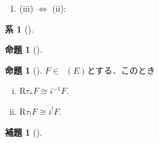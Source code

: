 \documentclass[leqno, 10pt, a4paper, dvipdfmx]{jsarticle}
\makeatletter
\theoremstyle{definition}
\newcommand{\rr}{\mathbf{R}}
\renewenvironment{proof}[1][\proofname]{\par
  \pushQED{\qed}%
  \normalfont \topsep6\p@\@plus6\p@\relax
  \trivlist
  \item[\hskip\labelsep
         \bfseries
    {#1}]\ignorespaces
}{%
  \popQED\endtrivlist\@endpefalse
}
\renewcommand{\proofname}{証明.}
\numberwithin{equation}{section}
\newcommand{\Rder}{\mathrm{R}}
\theoremstyle{mystyle}
\newtheorem{PRP}[AXM]{命題}
\newtheorem{LMM}[AXM]{補題}
\newtheorem{CRL}[AXM]{系}
\renewenvironment{leftbar}{%
  \def\FrameCommand{\textcolor{lightgray}{\vrule width 4pt} \hspace{10pt}}%
  \MakeFramed {\advance\hsize-\width \FrameRestore}}%
{\endMakeFramed}
\newcommand{\Dlcon}{\mathop{\mathsf{D}^{+}_{\rr_{>0}}}\nolimits}
\makeatother
\begin{document}
\begin{proof}
\begin{enumerate}
\begin{align*}
            &\cong
            p^{-1}\left. H^j\left(F\right)\right\rvert_{p^{-1}(x)}\\
            &\cong
            i^{-1}_{p^{-1}(x)}p^{-1}H^j\left(F\right)\\
            &\cong
            \left(p\circ i_{p^{-1}(x)}\right)^{-1}H^j\left(F\right)\\
            &\cong
            \left(i_{x}\circ p\rvert_{p^{-1}(x)}\right)^{-1}H^j\left(F\right)\\
            &\cong
            \left(p\rvert_{p^{-1}(x)}\right)^{-1}i_{x}^{-1}H^j\left(F\right)\\
            &\cong
            \left(p\rvert_{p^{-1}(x)}\right)^{-1}H^j\left(F\right)_{x}\\
            &\cong
            \left(H^j\left(F\right)_{x}\right)_{p^{-1}(x)}
        \end{align*}
        で，定数層となる（よって特に局所定数層となる）．
        \item\label{372-32} (iii) \(\Leftrightarrow\) (ii):      
    \end{enumerate}
\end{proof}

\begin{leftbar}
\begin{CRL}[{\cite[Corollary 3.7.3]{KS90}}]\label{crl:3.7.3}

\end{CRL}
\end{leftbar}

\begin{leftbar}
\begin{PRP}[{\cite[Proposition 3.7.4]{KS90}}]\label{prop:3.7.4}
    
\end{PRP}
\end{leftbar}

\begin{leftbar}
\begin{PRP}[{\cite[Proposition 3.7.5]{KS90}}]\label{prop:3.7.5}
    \(F\in\Dlcon(E)\)とする．このとき\begin{enumerate}[(i)]
        \item \(\Rder{\tau_{\ast}}F\cong i^{-1}F\).
        \item \(\Rder{\tau_{!}}F\cong i^{!}F\).
    \end{enumerate}
\end{PRP}
\end{leftbar}

\begin{leftbar}
\begin{LMM}[{\cite[Lemma 3.7.6]{KS90}}]\label{lmm:3.7.6}
    
\end{LMM}
\end{leftbar}
\end{document}
